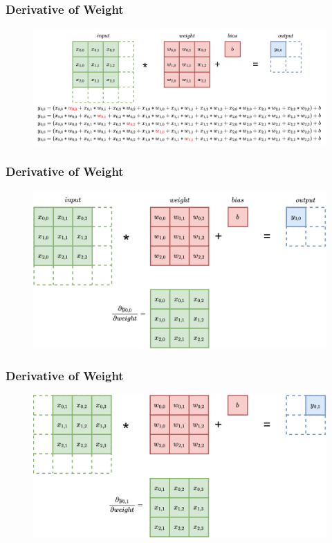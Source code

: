 \documentclass{beamer}
\begin{document}
    \begin{frame}
    	\frametitle{Derivative of Weight}
    	\begin{figure}
    		\includegraphics[width=1.\linewidth]{src/backprop_weight.drawio.png}
    	\end{figure}
    \end{frame}
    
    \begin{frame}
    	\frametitle{Derivative of Weight}
    	
    	\begin{figure}
    		\centering
    		\includegraphics[width=0.9\linewidth]{src/dweight.drawio}
    		\label{fig:dweight}
    	\end{figure}
    \end{frame}
    
    
    \begin{frame}
    	\frametitle{Derivative of Weight}
    	
\begin{figure}
	\centering
	\includegraphics[width=1.0\linewidth]{src/weight_grad.drawio}
\end{figure}
    \end{frame}
    
\end{document}
